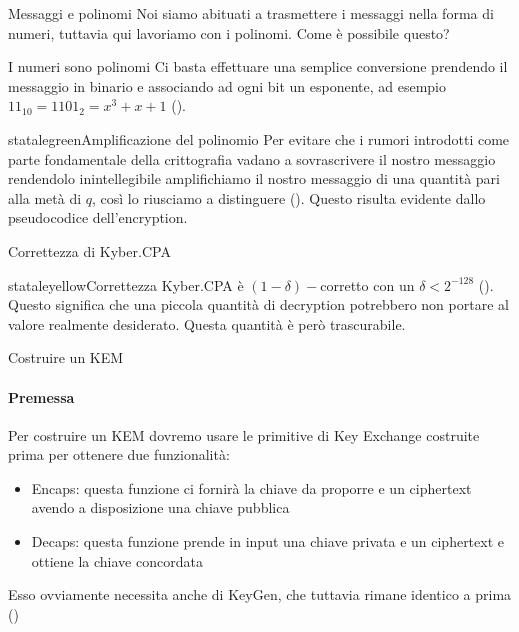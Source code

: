 \begin{frame}{Messaggi e polinomi}
    Noi siamo abituati a trasmettere i messaggi nella forma di numeri, tuttavia qui lavoriamo con i polinomi. Come è possibile questo?

    \begin{block}{I numeri sono polinomi}
        Ci basta effettuare una semplice conversione prendendo il messaggio in binario e associando ad ogni bit un esponente, ad esempio $11_{10}=1101_2=x^3+x+1$ (\cite{kyber17,babykyber}).
    \end{block}

    \begin{colorblock}{statalegreen}{Amplificazione del polinomio}
        Per evitare che i rumori introdotti come parte fondamentale della crittografia vadano a sovrascrivere il nostro messaggio rendendolo inintellegibile amplifichiamo il nostro messaggio di una quantità pari alla metà di $q$, così lo riusciamo a distinguere (\cite{kyber17,babykyber}). Questo risulta evidente dallo pseudocodice dell'encryption.
    \end{colorblock}
\end{frame}

    \begin{frame}{Correttezza di Kyber.CPA}

    \begin{colorblock}{stataleyellow}{Correttezza}
        Kyber.CPA è $(1-\delta)-$corretto con un $\delta<2^{-128}$ (\cite{kyber17}). Questo significa che una piccola quantità di decryption potrebbero non portare al valore realmente desiderato. Questa quantità è però trascurabile.
    \end{colorblock}

    \end{frame}

\begin{frame}{Costruire un KEM}
    \framesubtitle{Premessa}
    Per costruire un KEM dovremo usare le primitive di Key Exchange costruite prima per ottenere due funzionalità:\begin{itemize}
    \item Encaps: questa funzione ci fornirà la chiave da proporre e un ciphertext avendo a disposizione una chiave pubblica
    \item Decaps: questa funzione prende in input una chiave privata e un ciphertext e ottiene la chiave concordata
    \end{itemize}
    Esso ovviamente necessita anche di KeyGen, che tuttavia rimane identico a prima (\cite{kyber17})
\end{frame}


